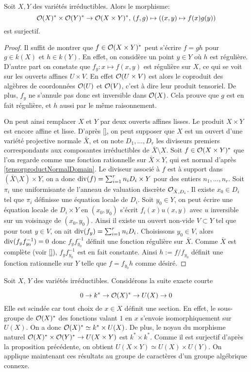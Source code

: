 \begin{prop}
Soit $X, Y$ des variétés irréductibles. Alors le morphisme:
$$\mathcal{O}(X)^*\times\mathcal{O}(Y)^*\rightarrow\mathcal{O}(X\times Y)^*,\,(f,g)\mapsto ((x,y )\mapsto f(x)g(y))$$
est surjectif.
\end{prop}
\begin{proof}
Il suffit de montrer que $f\in \mathcal{O}(X\times Y)^*$ peut s'écrire $f=gh$ pour $g\in k(X)$ et $h\in k(Y)$. En effet, on considère un point $y\in Y$ où $h$ est régulière. D'autre part on constate que $f_y:x\mapsto f(x,y)$ est régulière sur $X$, ce qui se voit sur les ouverts affines $U\times V$. En effet $\mathcal{O}(U\times V)$ est alors le coproduit des algèbres de coordonnées $\mathcal{O}(U)$ et $\mathcal{O}(V)$, c'est à dire leur produit tensoriel. De plus, $f_y$ ne s'annule pas donc est inversible dans $\mathcal{O}(X)$. Cela prouve que $g$ est en fait régulière, et $h$ aussi par le même raisonnement.

On peut ainsi remplacer $X$ et $Y$ par deux ouverts affines lisses. Le produit  $X\times Y$ est encore affine et lisse. D'après \ref{}, on peut supposer que $X$ est un ouvert d'une variété projective normale $\bar{X}$, et on note $D_1,...,D_r$ les diviseurs premiers correspondants aux composantes irréductibles de $\bar{X}\setminus X$. Soit $f\in \mathcal{O}(X\times Y)^*$ que l'on regarde comme une fonction rationnelle sur $\bar{X}\times Y$, qui est normal d'après \ref{tensorproductNormalDomain}. Le diviseur associé à $f$ est à support dans $(\bar{X}\setminus X)\times Y$, on a donc $\operatorname{div}(f)=\sum_{i=1}^rn_iD_i\times Y$ pour des entiers $n_1,...,n_r$. Soit $\pi_i$ une uniformisante de l'anneau de valuation discrète $\mathcal{O}_{\bar{X},D_i}$. Il existe $x_0\in D_i$ tel que $\pi_i$ définisse une équation locale de $D_i$. Soit $y_0\in Y$, on peut écrire une équation locale de $D_i\times Y$ en $(x_0,y_0)$ s'écrit $f_i(x)u(x,y)$ avec $u$ inversible sur un voisinage de $(x_0,y_0)$. Ainsi il existe un ouvert non-vide $V\subset Y$ tel que pour tout $y\in V$, on ait $\operatorname{div}(f_y)=\sum_{i=1}^rn_iD_i$. Choisissons $y_0\in V$, alors $\operatorname{div}(f_yf_{y_0}^{-1})=0$ donc $f_yf_{y_0}^{-1}$ définit une fonction régulière sur $\bar{X}$. Comme $\bar{X}$ est complète (voir \ref{}), $f_yf_{y_0}^{-1}$ est en fait constante. Ainsi $h:=f/f_{y_0}$ définit une fonction rationnelle sur $Y$ telle que $f=f_{y_0}h$ comme désiré.
\end{proof}

\noindent Soit $X,\,Y$ des variétés irréductibles. Considérons la suite exacte courte

\begin{equation}\label{eq:sesUnitGroup}
0\rightarrow k^* \rightarrow \mathcal{O}(X)^*\rightarrow U(X) \rightarrow 0
\end{equation}
Elle est scindée car tout choix de $x\in X$ définit une section. En effet, le sous-groupe de $\mathcal{O}(X)^*$ des fonctions valant $1$ en $x$ s'envoie isomorphiquement sur $U(X)$. On a donc $\mathcal{O}(X)^*\simeq k^*\times U(X)$. De plus, le noyau du morphisme naturel $\mathcal{O}(X)^*\times\mathcal{O}(Y)^*\rightarrow U(X\times Y)$ est $k^*\times k^*$. Comme il est surjectif d'après la proposition précédente, on obtient $U(X\times Y)\simeq U(X)\times U(Y)$.
On applique maintenant ces résultats au groupe de caractères d'un groupe algébrique connexe. 


